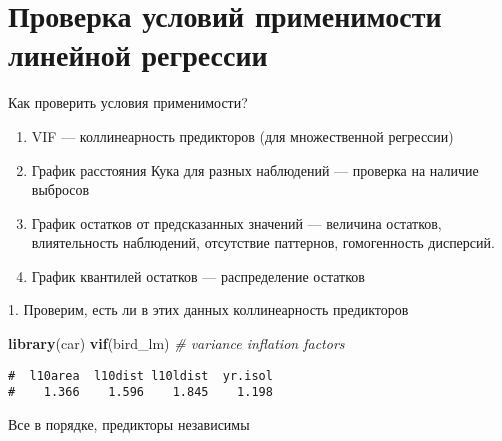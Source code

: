 \documentclass[
  ignorenonframetext,
  t,xcolor=table]{beamer}
\newenvironment{Shaded}{\begin{snugshade}}{\end{snugshade}}
\newcommand{\CommentTok}[1]{\textcolor[rgb]{0.56,0.35,0.01}{\textit{#1}}}
\newcommand{\FunctionTok}[1]{\textcolor[rgb]{0.13,0.29,0.53}{\textbf{#1}}}
\newcommand{\NormalTok}[1]{#1}
\providecommand{\tightlist}{%
  \setlength{\itemsep}{0pt}\setlength{\parskip}{0pt}}
\begin{document}
\hypertarget{ux43fux440ux43eux432ux435ux440ux43aux430-ux443ux441ux43bux43eux432ux438ux439-ux43fux440ux438ux43cux435ux43dux438ux43cux43eux441ux442ux438-ux43bux438ux43dux435ux439ux43dux43eux439-ux440ux435ux433ux440ux435ux441ux441ux438ux438}{%
\section{Проверка условий применимости линейной
регрессии}\label{ux43fux440ux43eux432ux435ux440ux43aux430-ux443ux441ux43bux43eux432ux438ux439-ux43fux440ux438ux43cux435ux43dux438ux43cux43eux441ux442ux438-ux43bux438ux43dux435ux439ux43dux43eux439-ux440ux435ux433ux440ux435ux441ux441ux438ux438}}

\begin{frame}{Как проверить условия применимости?}
\protect\hypertarget{ux43aux430ux43a-ux43fux440ux43eux432ux435ux440ux438ux442ux44c-ux443ux441ux43bux43eux432ux438ux44f-ux43fux440ux438ux43cux435ux43dux438ux43cux43eux441ux442ux438}{}
\begin{enumerate}
\tightlist
\item
  VIF --- коллинеарность предикторов (для множественной регрессии)
\item
  График расстояния Кука для разных наблюдений --- проверка на наличие
  выбросов
\item
  График остатков от предсказанных значений --- величина остатков,
  влиятельность наблюдений, отсутствие паттернов, гомогенность
  дисперсий.
\item
  График квантилей остатков --- распределение остатков
\end{enumerate}
\end{frame}

\begin{frame}[fragile]{1. Проверим, есть ли в этих данных коллинеарность
предикторов}
\protect\hypertarget{ux43fux440ux43eux432ux435ux440ux438ux43c-ux435ux441ux442ux44c-ux43bux438-ux432-ux44dux442ux438ux445-ux434ux430ux43dux43dux44bux445-ux43aux43eux43bux43bux438ux43dux435ux430ux440ux43dux43eux441ux442ux44c-ux43fux440ux435ux434ux438ux43aux442ux43eux440ux43eux432}{}
\begin{Shaded}
\begin{Highlighting}[]
\FunctionTok{library}\NormalTok{(car)}
\FunctionTok{vif}\NormalTok{(bird\_lm) }\CommentTok{\# variance inflation factors}
\end{Highlighting}
\end{Shaded}

\begin{verbatim}
#  l10area  l10dist l10ldist  yr.isol 
#    1.366    1.596    1.845    1.198
\end{verbatim}

\pause

Все в порядке, предикторы независимы
\end{frame}
\end{document}
